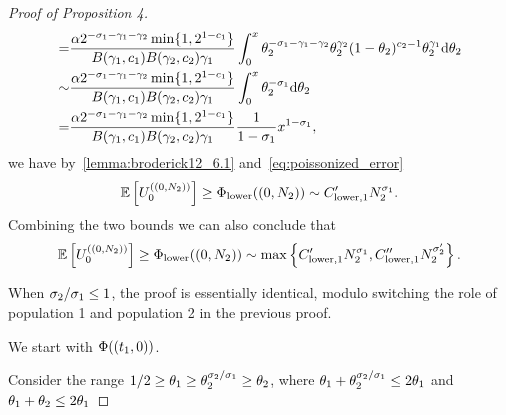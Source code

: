 \begin{proof}[Proof of Proposition 4]
\begin{align*}
    =&\frac{\alpha 2^{-\sigma_{1}-\gamma_{1}-\gamma_{2}}\min\{1, 2^{1-c_{1}}\}}{B(\gamma_{1}, c_{1})B(\gamma_{2}, c_{2})\gamma_{1}}\int_0^x \theta_{2}^{-\sigma_{1}-\gamma_{1}-\gamma_{2}} \theta_{2}^{\gamma_{2}} (1-\theta_{2})^{c_{2}-1} \theta_{2}^{\gamma_{1}}\mathrm{d}\theta_{2}\\
    \sim & \frac{\alpha 2^{-\sigma_{1}-\gamma_{1}-\gamma_{2}}\min\{1, 2^{1-c_{1}}\}}{B(\gamma_{1}, c_{1})B(\gamma_{2}, c_{2})\gamma_{1}}\int_0^x \theta_{2}^{-\sigma_{1}} \mathrm{d}\theta_{2}\\
    =& \frac{\alpha 2^{-\sigma_{1}-\gamma_{1}-\gamma_{2}}\min\{1, 2^{1-c_{1}}\}}{B(\gamma_{1}, c_{1})B(\gamma_{2}, c_{2})\gamma_{1}} \frac{1}{1-\sigma_{1}}x^{1-\sigma_{1}},
\end{align*}
we have by~\cref{lemma:broderick12_6.1} and~\cref{eq:poissonized_error}
\begin{equation}
    \E\left[\news{\zerovec}{(0, \samplesize{2})} \right] \ge \lowerbound((0, \samplesize{2}))\sim \constantlowerwithotherrate{1} \samplesize{2}^{\rate{1}} .
    \label{eq:lowerbound_2g1_pop2_alt2} 
\end{equation}
Combining the two bounds we can also conclude that 
\begin{equation}
   \E \left[\news{\zerovec}{(0, \samplesize{2})}\right]\ge \lowerbound((0, \samplesize{2}))\sim \max\left\{\constantlowerwithotherrate{1}\samplesize{2}^{\rate{1}}, \constantlowerwithrateprime{1}\samplesize{2}^{\rate{2}'} \right\}.
   \label{eq:lowerbound_2g1_pop2} 
\end{equation}


When $\sigma_{2}/\sigma_{1}\le 1$, the proof is essentially identical, modulo switching the role of population 1 and population 2 in the previous proof. 

We start with $\Phi((t_1,0))$. 

Consider the range $1/2 \ge \theta_{1} \ge \theta_{2}^{\sigma_{2}/\sigma_{1}}\ge \theta_{2}  $, where $\theta_{1}+\theta_{2}^{\sigma_{2}/\sigma_{1}}\le 2\theta_{1}$ and $\theta_{1}+\theta_{2}\le 2\theta_{1}$


\end{proof}
